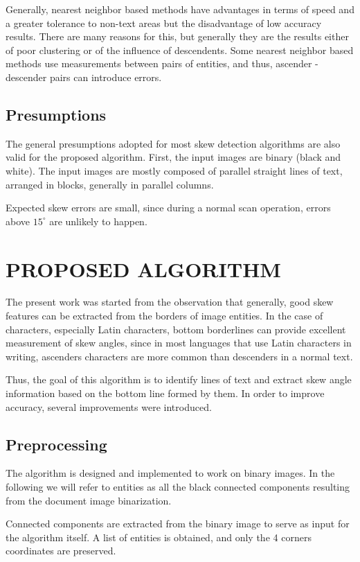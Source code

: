 \documentclass[10pt,a4paper]{article}
\begin{document}
	Generally, nearest neighbor based methods have advantages in terms of speed and a greater tolerance to non-text areas but the disadvantage of low accuracy results. There are many reasons for this, but generally they are the results either of poor clustering or of the influence of descendents. Some nearest neighbor based methods use measurements between pairs of entities, and thus, ascender - descender pairs can introduce errors.
	
	\subsection{Presumptions}
	The general presumptions adopted for most skew detection algorithms are also valid for the proposed algorithm. First, the input images are binary (black and white). The input images are mostly composed of parallel straight lines of text, arranged in blocks, generally in parallel columns.
	
	Expected skew errors are small, since during a normal scan operation, errors above \(15^{\circ}\) are unlikely to happen.
	
	\section{PROPOSED ALGORITHM}
	The present work was started from the observation that generally, good skew features can be extracted from the borders of image entities. In the case of characters, especially Latin characters, bottom borderlines can provide excellent measurement of skew angles, since in most languages that use Latin characters in writing, ascenders characters are more common than descenders in a normal text.
	
	Thus, the goal of this algorithm is to identify lines of text and extract skew angle information based on the bottom line formed by them. In order to improve accuracy, several improvements were introduced.
	
	\subsection{Preprocessing}
	The algorithm is designed and implemented to work on binary images. In the following we will refer to entities as all the black connected components resulting from the document image binarization.
	
	Connected components are extracted from the binary image to serve as input for the algorithm itself. A list of entities is obtained, and only the 4 corners coordinates are preserved.
	
\end{document}
